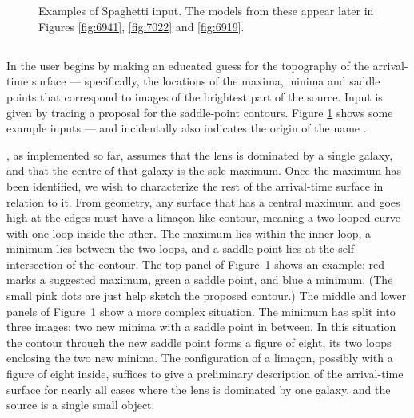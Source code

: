 \begin{figure}
  \centering
   \\
   \\
  \caption{Examples of Spaghetti input.  The models from these appear
    later in Figures \ref{fig:6941}, \ref{fig:7022} and \ref{fig:6919}.
  \label{fig:input-spag}}
\end{figure}

\subsection{\spl} \label{sec:SpaghettiLens}

In \spl the user begins by making an educated guess for the topography
of the arrival-time surface --- specifically, the locations of the
maxima, minima and saddle points that correspond to images of the
brightest part of the source.  Input is given by tracing a proposal
for the saddle-point contours.  Figure \ref{fig:input-spag} shows some
example inputs --- and incidentally also indicates the origin of the
name \spl.

\spl, as implemented so far, assumes that the lens is dominated by a
single galaxy, and that the centre of that galaxy is the sole maximum.
Once the maximum has been identified, we wish to characterize the rest
of the arrival-time surface in relation to it.  From geometry, any
surface that has a central maximum and goes high at the edges must
have a lima\c con-like contour, meaning a two-looped curve with one
loop inside the other.  The maximum lies within the inner loop, a
minimum lies between the two loops, and a saddle point lies at the
self-intersection of the contour.  The top panel of
Figure~\ref{fig:input-spag} shows an example: red marks a suggested
maximum, green a saddle point, and blue a minimum.  (The small pink
dots are just help sketch the proposed contour.)  The middle and lower
panels of Figure~\ref{fig:input-spag} show a more complex situation.
The minimum has split into three images: two new minima with a saddle
point in between.  In this situation the contour through the new
saddle point forms a figure of eight, its two loops enclosing the two
new minima.  The configuration of a lima\c con, possibly with a figure
of eight inside, suffices to give a preliminary description of the
arrival-time surface for nearly all cases where the lens is dominated
by one galaxy, and the source is a single small object.

